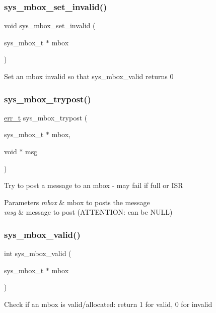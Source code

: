 \subsubsection{\texorpdfstring{sys\+\_\+mbox\+\_\+set\+\_\+invalid()}{sys\_mbox\_set\_invalid()}}
{\footnotesize\ttfamily void sys\+\_\+mbox\+\_\+set\+\_\+invalid (\begin{DoxyParamCaption}\item[{sys\+\_\+mbox\+\_\+t $\ast$}]{mbox }\end{DoxyParamCaption})}

Set an mbox invalid so that sys\+\_\+mbox\+\_\+valid returns 0 \mbox{\label{group__sys__mbox_gaa36345e48a49d67cbb0878cd4cbd2195}} 
\subsubsection{\texorpdfstring{sys\+\_\+mbox\+\_\+trypost()}{sys\_mbox\_trypost()}}
{\footnotesize\ttfamily \hyperlink{group__infrastructure__errors_gaf02d9da80fd66b4f986d2c53d7231ddb}{err\+\_\+t} sys\+\_\+mbox\+\_\+trypost (\begin{DoxyParamCaption}\item[{sys\+\_\+mbox\+\_\+t $\ast$}]{mbox,  }\item[{void $\ast$}]{msg }\end{DoxyParamCaption})}

Try to post a message to an mbox -\/ may fail if full or I\+SR 
\begin{DoxyParams}{Parameters}
{\em mbox} & mbox to posts the message \\
\hline
{\em msg} & message to post (A\+T\+T\+E\+N\+T\+I\+ON\+: can be N\+U\+LL) \\
\hline
\end{DoxyParams}
\mbox{\label{group__sys__mbox_ga8bcfab4bd791dd33f69a778e7585275d}} 
\subsubsection{\texorpdfstring{sys\+\_\+mbox\+\_\+valid()}{sys\_mbox\_valid()}}
{\footnotesize\ttfamily int sys\+\_\+mbox\+\_\+valid (\begin{DoxyParamCaption}\item[{sys\+\_\+mbox\+\_\+t $\ast$}]{mbox }\end{DoxyParamCaption})}

Check if an mbox is valid/allocated\+: return 1 for valid, 0 for invalid 